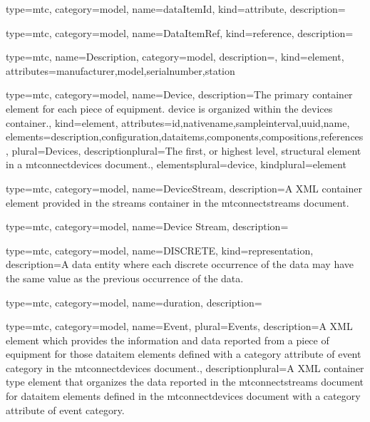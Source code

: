{
  type=mtc,
  category=model,
  name={dataItemId},
  kind={attribute},
  description={}
}


{
  type=mtc,
  category=model,
  name={DataItemRef},
  kind={reference},
  description={}
}


{
  type=mtc,
  name={Description},
  category=model,
  description={},
  kind={element},
  attributes={\gls{manufacturer},\gls{model},\gls{serialnumber},\gls{station}}
}


{
  type=mtc,
  category=model,
  name={Device},
  description={The primary container element for each piece of equipment. \gls{device} is organized within the \glspl{device}  container.},
  kind={element},
  attributes={\gls{id},\gls{nativename},\gls{sampleinterval},\gls{uuid},\gls{name}},
  elements={\gls{description},\gls{configuration},\glspl{dataitem},\glspl{component},\glspl{composition},\glspl{reference}},
  plural={Devices},
  descriptionplural={The first, or highest level, \gls{structural element} in a \glspl{mtconnectdevice} document.},
  elementsplural={\gls{device}},
  kindplural={element}
}


{
  type=mtc,
  category=model,
  name={DeviceStream},
  description={A XML container element provided in the \glspl{stream} container in the \glspl{mtconnectstream} document.}
}


{
  type=mtc,
  category=model,
  name={Device Stream},
  description={}
}


{
  type=mtc,
  category=model,
  name={DISCRETE},
  kind={representation},
  description={A \gls{data entity} where each discrete occurrence of the data may have the same value as the previous occurrence of the data.}
}


{
  type=mtc,
  category=model,
  name={duration},
  description={}
}



{
  type=mtc,
  category=model,
  name={Event},
  plural={Events},
  description={A XML element which provides the information and data reported from a piece of equipment for those \gls{dataitem} elements defined with a \gls{category} attribute of \gls{event category} in the \glspl{mtconnectdevice} document.},
  descriptionplural={A XML container type element that organizes the data reported in the \glspl{mtconnectstream} document for \gls{dataitem} elements defined in the \glspl{mtconnectdevice} document with a \gls{category} attribute of \gls{event category}.}
}



